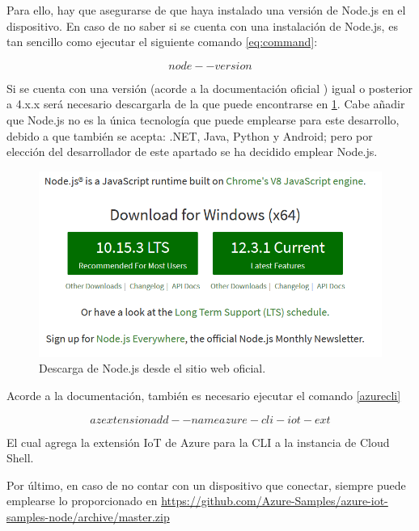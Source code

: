 \documentclass[10pt]{article}
\begin{document}
Para ello, hay que asegurarse de que haya instalado una versión de Node.js en el
dispositivo. En caso de no saber si se cuenta con una instalación de Node.js, es
 tan sencillo como ejecutar el siguiente comando
 \hyperref[eq:command]{\ref{eq:command}}:

\begin{equation}
 \label{eq:command}
node --version
\end{equation}

Si se cuenta con una versión (acorde a la documentación oficial
\cite{azure_iot}) igual o posterior a 4.x.x será necesario descargarla de la
que puede encontrarse en \cite{node} 
\hyperref[downloadnode]{\ref{downloadnode}}. Cabe añadir que Node.js no es la 
única tecnología que puede emplearse para este desarrollo, debido a que también
se acepta: .NET, Java, Python y Android; pero por elección del desarrollador de
este apartado se ha decidido emplear Node.js.

\begin{figure}[h!]
 \includegraphics[width=\linewidth]{./IoT/MicrosoftAzure/4-3-1_send_simulated_telemetry.png}
 \caption{Descarga de Node.js desde el sitio web oficial.}
 \label{downloadnode}

\end{figure}

Acorde a la documentación, también es necesario ejecutar el comando
\hyperref[eq:azurecli]{\ref{azurecli}}

\begin{equation}
 \label{eq:azurecli}
 az extension add --name azure-cli-iot-ext
\end{equation}

El cual agrega la extensión IoT de Azure para la CLI a la instancia de Cloud
Shell.

Por último, en caso de no contar con un dispositivo que conectar, siempre puede
emplearse lo proporcionado en 
\url{https://github.com/Azure-Samples/azure-iot-samples-node/archive/master.zip}
\end{document}

